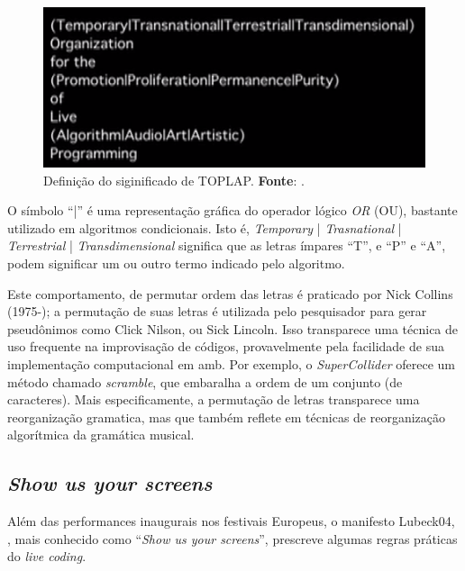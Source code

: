 \begin{figure}[!h]
  \centering
  \includegraphics[scale=0.6]{imagens/TOPLAP.png}
  \caption{Definição do siginificado de TOPLAP. \textbf{Fonte}: .}
  \label{fig:TOPLAP}
\end{figure}

O símbolo ``|'' é uma representação gráfica do operador lógico \emph{OR} (OU), bastante utilizado em algoritmos condicionais. Isto é, \emph{Temporary }| \emph{Trasnational} | \emph{Terrestrial} | \emph{Transdimensional} significa que as letras ímpares ``T'', e ``P'' e ``A'', podem significar um ou outro termo indicado pelo algoritmo.

Este comportamento, de permutar ordem das letras é praticado por Nick Collins (1975-); a permutação de suas letras é utilizada pelo pesquisador para gerar pseudônimos como Click Nilson, ou Sick Lincoln. Isso transparece uma técnica de uso frequente na improvisação de códigos, provavelmente pela facilidade de sua implementação computacional em amb. Por exemplo, o \emph{SuperCollider} oferece um método chamado \emph{scramble}, que embaralha a ordem de um conjunto (de caracteres). Mais especificamente, a permutação de letras transparece uma reorganização gramatica, mas que também reflete em técnicas de reorganização algorítmica da gramática musical.

\subsection{\emph{Show us your screens}}\label{sec:showusyourscreens}

Além das performances inaugurais nos festivais Europeus, o manifesto Lubeck04, , mais conhecido como ``\emph{Show us your screens}'', prescreve algumas regras práticas do \emph{live coding}. 

